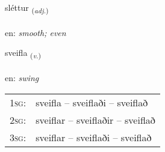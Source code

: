 \documentclass[frontgrid, backgrid]{flacards}\usepackage[]{graphicx}\usepackage[]{xcolor}
\begin{document}
\renewcommand{\flhead}{\vskip5pt \fboxsep=0pt {\small\bfseries\footnotesize Lýsingarorð | Adjective}}
\renewcommand{\fcfoot}{\vskip5pt \fboxsep=0pt \hspace{2pt}{\small\bfseries\footnotesize 3K}}

\renewcommand{\blhead}{\vskip5pt {\small\bfseries\footnotesize Lýsingarorð | Adjective }}
\renewcommand{\bcfoot}{\vskip5pt \hspace{2pt}{\small\bfseries\footnotesize 3K}}


{sléttur \small{\textsubscript{(\textit{adj.})}} \\[1ex] %
\textphonetic{[stljɛhtʏr]} \\
en: \emph{smooth; even} \\  [2ex]
\renewcommand*{\arraystretch}{0.8}
}

\renewcommand{\flhead}{\vskip5pt \fboxsep=0pt {\small\bfseries\footnotesize Sagnorð | Verb}}
\renewcommand{\fcfoot}{\vskip5pt \fboxsep=0pt \hspace{2pt}{\small\bfseries\footnotesize 3K}}

\renewcommand{\blhead}{\vskip5pt {\small\bfseries\footnotesize Sagnorð | Verb }}
\renewcommand{\bcfoot}{\vskip5pt \hspace{2pt}{\small\bfseries\footnotesize 3K}}


{sveifla \small{\textsubscript{(\textit{v.})}} \\[1ex] %
\textphonetic{[sveipla]} \\
en: \emph{swing} \\  [2ex]
\renewcommand*{\arraystretch}{0.8}
\begin{tabular}{p{1cm}l}
\textsc{1sg}: & sveifla -- sveiflaði -- sveiflað \\ 
\textsc{2sg}: & sveiflar -- sveiflaðir -- sveiflað \\ 
\textsc{3sg}: & sveiflar -- sveiflaði -- sveiflað \\ 
\end{tabular}
}
\end{document}
